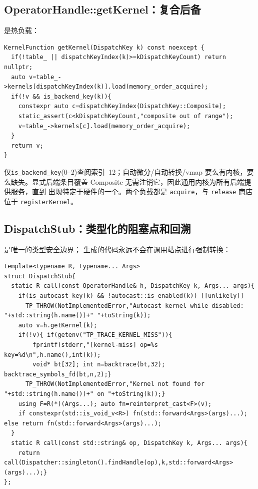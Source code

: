 \subsection{OperatorHandle::getKernel：复合后备}
\label{sec:handle}

是热负载：

\begin{lstlisting}[caption={backend fallback.}, label=lst:getkernel]
KernelFunction getKernel(DispatchKey k) const noexcept {
  if(!table_ || dispatchKeyIndex(k)>=kDispatchKeyCount) return nullptr;
  auto v=table_->kernels[dispatchKeyIndex(k)].load(memory_order_acquire);
  if(!v && is_backend_key(k)){
    constexpr auto c=dispatchKeyIndex(DispatchKey::Composite);
    static_assert(c<kDispatchKeyCount,"composite out of range");
    v=table_->kernels[c].load(memory_order_acquire);
  }
  return v;
}
\end{lstlisting}

仅\texttt{is\_backend\_key}(0--2)查阅索引~12；自动微分/自动转换/vmap
要么有内核，要么缺失。显式后端条目覆盖 Composite
无需注销它，因此通用内核为所有后端提供服务，直到
出现特定于硬件的一个。两个负载都是 \texttt{acquire}，与
\texttt{release} 商店位于 \texttt{registerKernel}。

\subsection{DispatchStub：类型化的阻塞点和回溯}
\label{sec:stub}

是唯一的类型安全边界；
生成的代码永远不会在调用站点进行强制转换：

\begin{lstlisting}[caption={autocast guard + miss trace.}, label=lst:stub]
template<typename R, typename... Args>
struct DispatchStub{
  static R call(const OperatorHandle& h, DispatchKey k, Args... args){
    if(is_autocast_key(k) && !autocast::is_enabled(k)) [[unlikely]]
      TP_THROW(NotImplementedError,"Autocast kernel while disabled: "+std::string(h.name())+" "+toString(k));
    auto v=h.getKernel(k);
    if(!v){ if(getenv("TP_TRACE_KERNEL_MISS")){
        fprintf(stderr,"[kernel-miss] op=%s key=%d\n",h.name(),int(k));
        void* bt[32]; int n=backtrace(bt,32); backtrace_symbols_fd(bt,n,2);}
      TP_THROW(NotImplementedError,"Kernel not found for "+std::string(h.name())+" on "+toString(k));}
    using F=R(*)(Args...); auto fn=reinterpret_cast<F>(v);
    if constexpr(std::is_void_v<R>) fn(std::forward<Args>(args)...); else return fn(std::forward<Args>(args)...);
  }
  static R call(const std::string& op, DispatchKey k, Args... args){
    return call(Dispatcher::singleton().findHandle(op),k,std::forward<Args>(args)...);}
};
\end{lstlisting}

